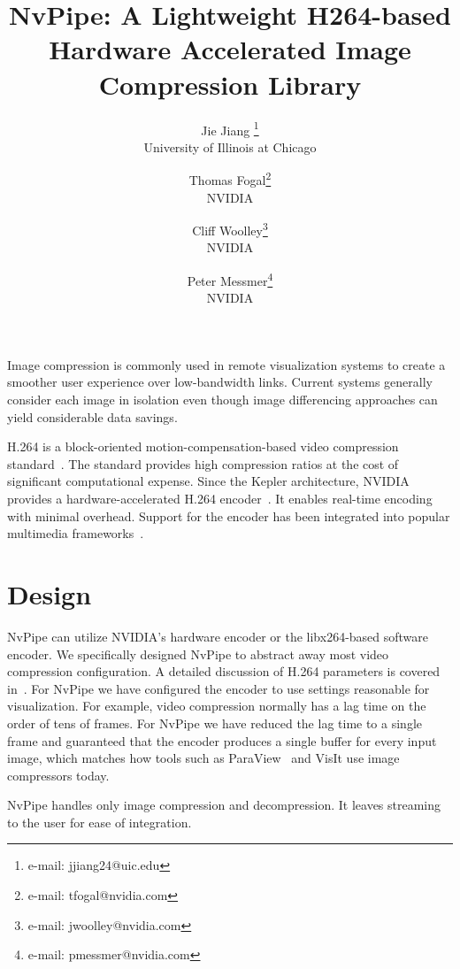 \documentclass[review]{vgtc}                 %
\title{NvPipe: A Lightweight H264-based Hardware Accelerated Image Compression Library}
\author{Jie Jiang \thanks{e-mail: jjiang24@uic.edu}\\ %
        \scriptsize University of Illinois at Chicago %
\and Thomas Fogal\thanks{e-mail: tfogal@nvidia.com}\\ %
     \scriptsize NVIDIA %
\and Cliff Woolley\thanks{e-mail: jwoolley@nvidia.com}\\ %
     \scriptsize NVIDIA %
\and Peter Messmer\thanks{e-mail: pmessmer@nvidia.com}\\ %
     \scriptsize NVIDIA} %
\begin{document}


\maketitle

Image compression is commonly used in remote visualization systems to create a smoother user experience over low-bandwidth links. Current systems generally consider each image in isolation even though image differencing approaches can yield considerable data savings.

H.264 is a block-oriented motion-compensation-based video compression standard~\cite{wiegand2003overview}. The standard provides high compression ratios at the cost of significant computational expense. Since the Kepler architecture, NVIDIA provides a hardware-accelerated H.264 encoder~\cite{nvcodec}. It enables real-time encoding with minimal overhead. Support for the encoder has been integrated into popular multimedia frameworks~\cite{ffmpeg}. 

\section{Design}

NvPipe can utilize NVIDIA's hardware encoder or the libx264-based software encoder. We specifically designed NvPipe to abstract away most video compression configuration. A detailed discussion of H.264 parameters is covered in~\cite{wiegand2003overview}. For NvPipe we have configured the encoder to use settings reasonable for visualization. For example, video compression normally has a lag time on the order of tens of frames. For NvPipe we have reduced the lag time to a single frame and guaranteed that the encoder produces a single buffer for every input image, which matches how tools such as ParaView~\cite{henderson2004paraview} and VisIt use image compressors today.

NvPipe handles only image compression and decompression. It leaves streaming to the user for ease of integration.
\end{document}

